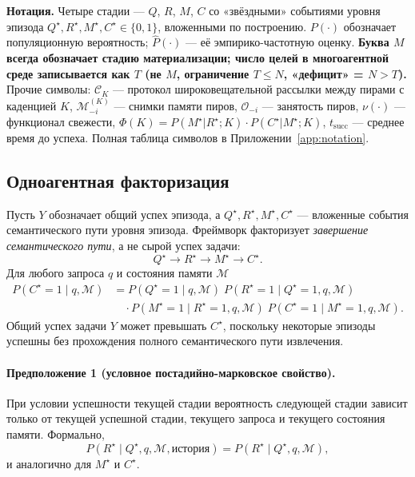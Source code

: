 \documentclass{article}
\begin{document}
\textbf{Нотация.} Четыре стадии --- $Q$, $R$, $M$, $C$ со «звёздными» событиями уровня эпизода $Q^\star,R^\star,M^\star,C^\star\!\in\!\{0,1\}$, вложенными по построению. $P(\cdot)$ обозначает популяционную вероятность; $\hat{P}(\cdot)$ --- её эмпирико-частотную оценку. \textbf{Буква $M$ всегда обозначает стадию материализации; число целей в многоагентной среде записывается как $T$ (не $M$, ограничение $T{\le}N$, «дефицит» = $N{>}T$).} Прочие символы: $\mathcal{C}_K$ --- протокол широковещательной рассылки между пирами с каденцией $K$, $\mathcal{M}_{-i}^{(K)}$ --- снимки памяти пиров, $\mathcal{O}_{-i}$ --- занятость пиров, $\nu(\cdot)$ --- функционал свежести, $\Phi(K){=}P(M^\star|R^\star;K)\!\cdot\!P(C^\star|M^\star;K)$, $t_{\mathrm{succ}}$ --- среднее время до успеха. Полная таблица символов в Приложении~\ref{app:notation}.

\subsection{Одноагентная факторизация}
\label{sec:single-theory}

Пусть $Y$ обозначает общий успех эпизода, а
$Q^\star, R^\star, M^\star, C^\star$ --- вложенные события семантического пути
уровня эпизода. Фреймворк факторизует \emph{завершение семантического
пути}, а не сырой успех задачи:
\[
Q^\star \rightarrow R^\star \rightarrow M^\star \rightarrow C^\star.
\]
Для любого запроса $q$ и состояния памяти $\mathcal{M}$
\begin{align*}
P(C^\star = 1 \mid q, \mathcal{M})
&=
P(Q^\star = 1 \mid q, \mathcal{M})\;
P(R^\star = 1 \mid Q^\star = 1, q, \mathcal{M}) \\
&\quad \cdot
P(M^\star = 1 \mid R^\star = 1, q, \mathcal{M})\;
P(C^\star = 1 \mid M^\star = 1, q, \mathcal{M}).
\end{align*}
Общий успех задачи $Y$ может превышать $C^\star$, поскольку некоторые эпизоды
успешны без прохождения полного семантического пути извлечения.

\paragraph{Предположение 1 (условное постадийно-марковское свойство).}
При условии успешности текущей стадии вероятность
следующей стадии зависит только от текущей успешной стадии,
текущего запроса и текущего состояния памяти. Формально,
\[
P(R^\star \mid Q^\star, q, \mathcal{M}, \text{история}) = P(R^\star \mid Q^\star, q, \mathcal{M}),
\]
и аналогично для $M^\star$ и $C^\star$.
\end{document}

